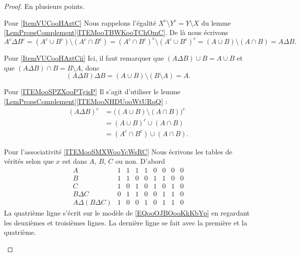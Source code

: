 \begin{proof}
	En plusieurs points.
	\begin{subproof}
		\item[Pour \ref{ItemVUCooHAztC}]
		Nous rappelons l'égalité \( X^c\setminus Y^c=Y\setminus X\) du lemme \ref{LemPropsComplement}\ref{ITEMooTBWKooTChOmC}. De là nous écrivons
		\begin{equation}
			A^c\Delta B^c=(A^c\cup B^c)\setminus(A^c\cap B^c)=(A^c\cap B^c)^c\setminus(A^c\cup B^c)^c=(A\cup B)\setminus (A\cap B)=A\Delta B.
		\end{equation}
		\item[Pour \ref{ItemVUCooHAztCii}]
		Ici, il faut remarquer que \( (A\Delta B)\cup B=A\cup B\) et que \( (A\Delta B)\cap B=B\setminus A\), donc
		\begin{equation}
			(A\Delta B)\Delta B=(A\cup B)\setminus (B\setminus A)=A.
		\end{equation}

		\item[Pour \ref{ITEMooSPZXooPTgisP}]
		Il s'agit d'utiliser le lemme \ref{LemPropsComplement}\ref{ITEMooNHDUooWtURqQ} :
		\begin{subequations}
			\begin{align}
				(A\Delta B)^c & =\Big( (A\cup B)\setminus (A\cap B) \Big)^c \\
				              & =(A\cup B)^c  \cup(A\cap B)                 \\
				              & =(A^c\cap B^c)\cup(A\cap B).
			\end{align}
		\end{subequations}
		\item[Pour l'associativité \ref{ITEMooSMXWooYcWsRC}]
		Nous écrivons les tables de vérités selon que \( x\) est dans \( A\), \( B\), \( C\) ou non. D'abord
		\begin{equation}
			\begin{array}{|c|c|c|c|c|c|c|c|c|}
				A                   & 1 & 1 & 1 & 1 & 0 & 0 & 0 & 0 \\
				B                   & 1 & 1 & 0 & 0 & 1 & 1 & 0 & 0 \\
				C                   & 1 & 0 & 1 & 0 & 1 & 0 & 1 & 0 \\
				\hline%
				B\Delta C           & 0 & 1 & 1 & 0 & 0 & 1 & 1 & 0 \\
				\hline%
				A\Delta (B\Delta C) & 1 & 0 & 0 & 1 & 0 & 1 & 1 & 0
			\end{array}
		\end{equation}
		La quatrième ligne s'écrit sur le modèle de \eqref{EQooOJBOooKkKbYp} en regardant les deuxièmes et troisièmes lignes. La dernière ligne se fait avec la première et la quatrième.


\end{subproof}
\end{proof}
